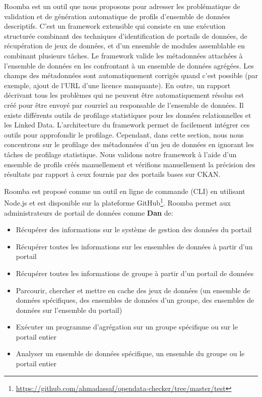 Roomba est un outil que nous proposons pour adresser les probl\'{e}matique de validation et de g\'{e}n\'{e}ration automatique de profils d'ensemble de donn\'{e}es descriptifs. C'est un framework extensible qui consiste en une ex\'{e}cution structur\'{e}e combinant des techniques d'identification de portails de donn\'{e}es, de r\'{e}cup\'{e}ration de jeux de donn\'{e}es, et d'un ensemble de modules assemblable en combinant plusieurs tâches. Le framework valide les m\'{e}tadonn\'{e}es attach\'{e}es à l'ensemble de donn\'{e}es en les confrontant à un ensemble de donn\'{e}es agr\'{e}g\'{e}es. Les champs des m\'{e}tadonn\'{e}es sont automatiquement corrig\'{e}s quand c'est possible (par exemple, ajout de l'URL d'une licence manquante). En outre, un rapport d\'{e}crivant tous les probl\`{e}mes qui ne peuvent être automatiquement r\'{e}solus est cr\'{e}\'{e} pour être envoy\'{e} par courriel au responsable de l'ensemble de donn\'{e}es. Il existe diff\'{e}rents outils de profilage statistiques pour les donn\'{e}es relationnelles et les Linked Data. L'architecture du framework permet de facilement int\'{e}grer ces outils pour approfondir le profilage. Cependant, dans cette section, nous nous concentrons sur le profilage des m\'{e}tadonn\'{e}es d'un jeu de donn\'{e}es en ignorant les tâches de profilage statistique. Nous validons notre framework à l'aide d'un ensemble de profils cr\'{e}\'{e}s manuellement et v\'{e}rifions manuellement la pr\'{e}cision des r\'{e}sultats par rapport à ceux fournis par des portails bases sur CKAN.

Roomba est propos\'{e} comme un outil en ligne de commande (CLI) en utilisant Node.js et est disponible sur la plateforme GitHub\footnote{\url{https://github.com/ahmadassaf/opendata-checker/tree/master/test}}. Roomba permet aux administrateurs de portail de donn\'{e}es comme \textbf{Dan} de:

\begin{itemize}
	\item R\'{e}cup\'{e}rer des informations sur le syst\`{e}me de gestion des donn\'{e}es du portail
	\item R\'{e}cup\'{e}rer toutes les informations sur les ensembles de donn\'{e}es à partir d'un portail
	\item R\'{e}cup\'{e}rer toutes les informations de groupe à partir d'un portail de donn\'{e}es
	\item Parcourir, chercher et mettre en cache des jeux de donn\'{e}es (un ensemble de donn\'{e}es sp\'{e}cifiques, des ensembles de donn\'{e}es d'un groupe, des ensembles de donn\'{e}es sur l'ensemble du portail)
	\item Ex\'{e}cuter un programme d'agr\'{e}gation sur un groupe sp\'{e}cifique ou sur le portail entier
	\item Analyser un ensemble de donn\'{e}es sp\'{e}cifique, un ensemble du groupe ou le portail entier
\end{itemize}

